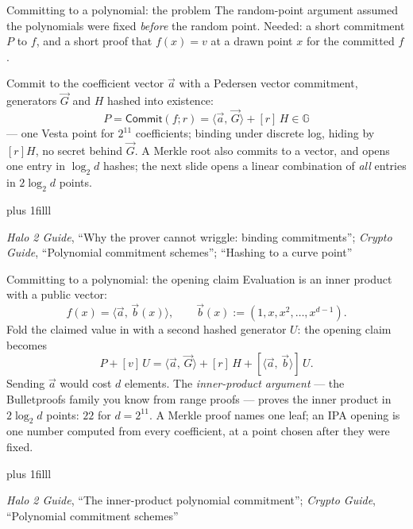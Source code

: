 \documentclass[aspectratio=169,11pt]{beamer}
\newcommand{\G}{\mathbb{G}}
\newcommand{\Comm}{\ensuremath{\mathsf{Commit}}}
\newcommand{\ip}[2]{\langle #1,\, #2 \rangle}
\newcommand{\src}[1]{\par\vskip0pt plus 1filll
  {\fontsize{6}{7.2}\selectfont\color{arbdim}\raggedright #1\par}}
\begin{document}
\begin{frame}{Committing to a polynomial: the problem}
The random-point argument assumed the polynomials were fixed
\emph{before} the random point. Needed: a short commitment $P$ to $f$,
and a short proof that $f(x) = v$ at a drawn point $x$ for the committed
$f$.

\medskip
Commit to the coefficient vector $\vec a$ with a Pedersen vector
commitment, generators $\vec G$ and $H$ hashed into existence:
\[
P = \Comm(f; r) = \ip{\vec a}{\vec G} + [r]\,H \in \G
\]
--- one Vesta point for $2^{11}$ coefficients; binding under discrete
log, hiding by $[r]H$, no secret behind $\vec G$. A Merkle root also
commits to a vector, and opens one entry in $\log_2 d$ hashes; the next
slide opens a linear combination of \emph{all} entries in $2\log_2 d$
points.
\src{\emph{Halo 2 Guide}, ``Why the prover cannot wriggle: binding
commitments''; \emph{Crypto Guide}, ``Polynomial commitment schemes'';
``Hashing to a curve point''}
\end{frame}

\begin{frame}{Committing to a polynomial: the opening claim}
Evaluation is an inner product with a public vector:
\[
f(x) = \ip{\vec a}{\vec b(x)}, \qquad \vec b(x) := (1, x, x^2, \dots,
x^{d-1}) .
\]
Fold the claimed value in with a second hashed generator $U$: the opening
claim becomes
\[
P + [v]\,U = \ip{\vec a}{\vec G} + [r]\,H + [\ip{\vec a}{\vec b}]\,U .
\]
Sending $\vec a$ would cost $d$ elements. The \emph{inner-product
argument} --- the Bulletproofs family you know from range proofs ---
proves the inner product in $2\log_2 d$ points: $22$ for $d = 2^{11}$.
A Merkle proof names one leaf; an IPA opening is one number computed
from every coefficient, at a point chosen after they were fixed.
\src{\emph{Halo 2 Guide}, ``The inner-product polynomial commitment'';
\emph{Crypto Guide}, ``Polynomial commitment schemes''}
\end{frame}
\end{document}
